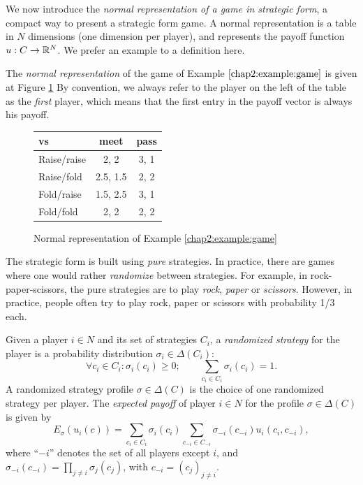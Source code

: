 We now introduce the
 \emph{normal representation of a game in strategic form},
a compact way to present a strategic form game.
A normal representation is a table in $N$ dimensions
 (one dimension per player),
 and represents the payoff function
 $u : C \rightarrow \mathbb{R}^N$.
 We prefer an example to a definition here.
\begin{example}
The \emph{normal representation} of the game of Example $\ref{chap2:example:game}$ is given at Figure \ref{chap2:table}
By convention, we always refer to the player on the left of the table as the \emph{first} player,
which means that the first entry in the payoff vector is always his payoff.
\begin{figure}[!ht]
\centering
\begin{tabular}{l|cc}
\TAtwo{} vs \TAone{} & meet & pass \\
\hline
Raise/raise & 2, 2 & 3, 1 \\
Raise/fold & 2.5, 1.5 & 2, 2 \\
Fold/raise & 1.5, 2.5 & 3, 1 \\
Fold/fold & 2, 2 & 2, 2
\end{tabular}
\caption{Normal representation of Example \ref{chap2:example:game}}
\label{chap2:table}
\end{figure}

\end{example}

The strategic form is built using \emph{pure} strategies. In practice, there are games where one would rather \emph{randomize} between strategies.
For example, in rock-paper-scissors, the pure strategies are to play \emph{rock}, \emph{paper} or \emph{scissors}. However, in practice, people
often try to play rock, paper or scissors with probability 1/3 each.

\begin{definition}
Given a player $i \in N$ and its set of strategies $C_i$, a \emph{randomized strategy} for the player is a probability distribution $\sigma_i \in \Delta(C_i)$:
$$ \forall c_i \in C_i: \sigma_i(c_i) \geq 0; \qquad \sum_{c_i \in C_i} \sigma_i(c_i) = 1.$$
A randomized strategy profile $\sigma \in \Delta(C)$ is the choice of one randomized strategy per player.
The \emph{expected payoff} of player $i \in N$ for the profile $\sigma \in \Delta(C)$ is given by
$$E_\sigma(u_i(c)) = \sum_{c_i \in C_i} \sigma_i(c_i) \sum_{c_{-i} \in C_{-i}} \sigma_{-i}(c_{-i}) u_i(c_i, c_{-i}), $$
where ``$-i$'' denotes the set of all players except $i$, and
$\sigma_{-i}(c_{-i}) = \prod_{j \neq i}\sigma_{j}(c_j)$, with $c_{-i} = (c_j)_{j \neq i}$.
\end{definition}


